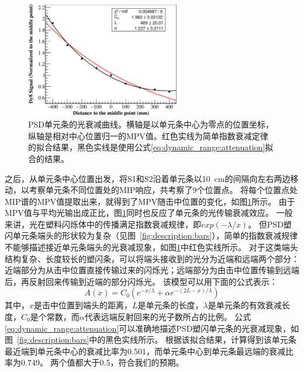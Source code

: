\begin{figure}[htbp]
	\centering
	\includegraphics[width=0.6\textwidth]{chap/dynamic_range/fig/atten_right.eps}
	\caption{PSD单元条的光衰减曲线。横轴是以单元条中心为零点的位置坐标，纵轴是相对中心位置归一的MPV值。红色实线为简单指数衰减定律的拟合结果，黑色实线是使用公式\ref{eq:dynamic_range:attenuation}拟合的结果。}
	\label{fig:dynamic_range:attenuation}
\end{figure}
之后，从单元条中心位置出发，将S1和S2沿着单元条以\SI{10}{cm}的间隔向左右两边移动，以考察单元条不同位置处的MIP响应，共考察了9个位置点。
将每个位置点处MIP谱的MPV值提取出来，就得到了MPV随击中位置的变化，如图\ref{fig:dynamic_range:attenuation}所示。
由于MPV值与平均光输出成正比，图\ref{fig:dynamic_range:attenuation}同时也反应了单元条的光传输衰减效应。
一般来讲，光在塑料闪烁体中的传播满足指数衰减规律，即$exp(-\lambda/x)$。
但PSD塑闪单元条端头的形状较为复杂（见图~\ref{fig:description:bars}），简单的指数衰减规律不能够描述接近单元条端头的光衰减现象，如图\ref{fig:dynamic_range:attenuation}中红色实线所示。
对于这类端头结构复杂、长度较长的塑闪条，可以将端头接收到的光分为近端和远端两个部分\cite{atten_taiuti_measurement_1996,atten_karsch_design_2001}：近端部分为从击中位置直接传输过来的闪烁光；远端部分为由击中位置传输到远端后，再反射回来传输到近端的部分闪烁光。
该模型可以用下面的公式表示：
\begin{equation}
A(x)=C_0(e^{-x/\lambda} + \alpha e^{-(2L-x)/\lambda})
\label{eq:dynamic_range:attenuation}
\end{equation}
其中，$x$是击中位置到端头的距离，$L$是单元条的长度，$\lambda$是单元条的有效衰减长度，$C_0$是个常数，而$\alpha$代表远端反射回来的光子数所占的比例。
公式\ref{eq:dynamic_range:attenuation}可以准确地描述PSD塑闪单元条的光衰减现象，如图~\ref{fig:description:bars}中的黑色实线所示。
根据该拟合结果，计算得到该单元条最近端到单元条中心的衰减比率为0.501，而单元条中心到单元条最远端的衰减比率为0.749。
两个值都大于0.5，符合我们的预期。

